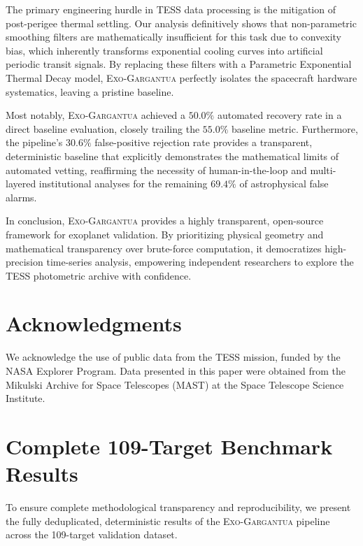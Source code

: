 \documentclass[twocolumn,linenumbers]{aastex701}
\begin{document}
The primary engineering hurdle in TESS data processing is the mitigation of post-perigee thermal settling. Our analysis definitively shows that non-parametric smoothing filters are mathematically insufficient for this task due to convexity bias, which inherently transforms exponential cooling curves into artificial periodic transit signals. By replacing these filters with a Parametric Exponential Thermal Decay model, \textsc{Exo-Gargantua} perfectly isolates the spacecraft hardware systematics, leaving a pristine baseline.

Most notably, \textsc{Exo-Gargantua} achieved a $50.0\%$ automated recovery rate in a direct baseline evaluation, closely trailing the $55.0\%$ baseline metric. Furthermore, the pipeline's $30.6\%$ false-positive rejection rate provides a transparent, deterministic baseline that explicitly demonstrates the mathematical limits of automated vetting, reaffirming the necessity of human-in-the-loop and multi-layered institutional analyses for the remaining $69.4\%$ of astrophysical false alarms.

In conclusion, \textsc{Exo-Gargantua} provides a highly transparent, open-source framework for exoplanet validation. By prioritizing physical geometry and mathematical transparency over brute-force computation, it democratizes high-precision time-series analysis, empowering independent researchers to explore the TESS photometric archive with confidence.

\section*{Acknowledgments}
We acknowledge the use of public data from the TESS mission, funded by the NASA Explorer Program. Data presented in this paper were obtained from the Mikulski Archive for Space Telescopes (MAST) at the Space Telescope Science Institute.

\appendix
\section{Complete 109-Target Benchmark Results}
\label{sec:appendix_table}

To ensure complete methodological transparency and reproducibility, we present the fully deduplicated, deterministic results of the \textsc{Exo-Gargantua} pipeline across the 109-target validation dataset. 



{}

\end{document}
